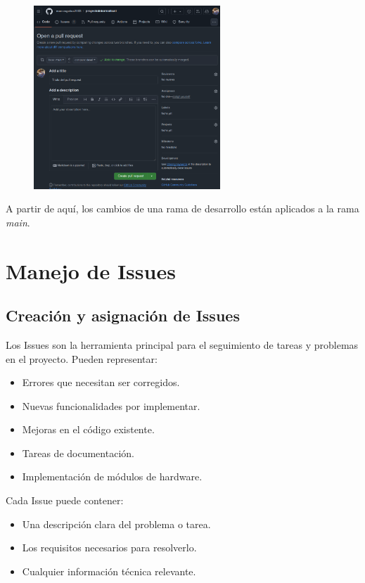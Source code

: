 \documentclass[a4paper]{article}
\begin{document}
\begin{figure}[h!]
    \centering
    \includegraphics[width=7cm]{../imagenesParaInformes/openAPullRequest.png}
\end{figure}

\indent A partir de aquí, los cambios de una rama de desarrollo están aplicados a la rama \textit{main}.


\section{Manejo de Issues}

\subsection{Creación y asignación de Issues}

\indent Los Issues son la herramienta principal para el seguimiento de tareas y problemas en el proyecto. Pueden representar: \\

\begin{itemize}
    \item Errores que necesitan ser corregidos.
    \item Nuevas funcionalidades por implementar.
    \item Mejoras en el código existente.
    \item Tareas de documentación.
    \item Implementación de módulos de hardware.
\end{itemize}

\indent Cada Issue puede contener: \\

\begin{itemize}
    \item Una descripción clara del problema o tarea.
    \item Los requisitos necesarios para resolverlo.
    \item Cualquier información técnica relevante.
\end{itemize}
\end{document}

